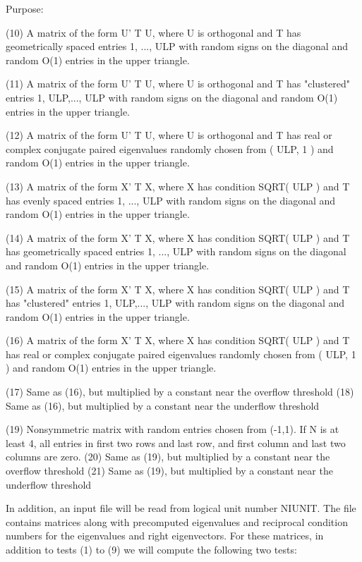 \begin{DoxyParagraph}{Purpose\+: }
\begin{DoxyVerb}
    (10) A matrix of the form  U' T U, where U is orthogonal and
         T has geometrically spaced entries 1, ..., ULP with random
         signs on the diagonal and random O(1) entries in the upper
         triangle.

    (11) A matrix of the form  U' T U, where U is orthogonal and
         T has "clustered" entries 1, ULP,..., ULP with random
         signs on the diagonal and random O(1) entries in the upper
         triangle.

    (12) A matrix of the form  U' T U, where U is orthogonal and
         T has real or complex conjugate paired eigenvalues randomly
         chosen from ( ULP, 1 ) and random O(1) entries in the upper
         triangle.

    (13) A matrix of the form  X' T X, where X has condition
         SQRT( ULP ) and T has evenly spaced entries 1, ..., ULP
         with random signs on the diagonal and random O(1) entries
         in the upper triangle.

    (14) A matrix of the form  X' T X, where X has condition
         SQRT( ULP ) and T has geometrically spaced entries
         1, ..., ULP with random signs on the diagonal and random
         O(1) entries in the upper triangle.

    (15) A matrix of the form  X' T X, where X has condition
         SQRT( ULP ) and T has "clustered" entries 1, ULP,..., ULP
         with random signs on the diagonal and random O(1) entries
         in the upper triangle.

    (16) A matrix of the form  X' T X, where X has condition
         SQRT( ULP ) and T has real or complex conjugate paired
         eigenvalues randomly chosen from ( ULP, 1 ) and random
         O(1) entries in the upper triangle.

    (17) Same as (16), but multiplied by a constant
         near the overflow threshold
    (18) Same as (16), but multiplied by a constant
         near the underflow threshold

    (19) Nonsymmetric matrix with random entries chosen from (-1,1).
         If N is at least 4, all entries in first two rows and last
         row, and first column and last two columns are zero.
    (20) Same as (19), but multiplied by a constant
         near the overflow threshold
    (21) Same as (19), but multiplied by a constant
         near the underflow threshold

    In addition, an input file will be read from logical unit number
    NIUNIT. The file contains matrices along with precomputed
    eigenvalues and reciprocal condition numbers for the eigenvalues
    and right eigenvectors. For these matrices, in addition to tests
    (1) to (9) we will compute the following two tests:


\end{DoxyVerb}
\end{DoxyParagraph}
